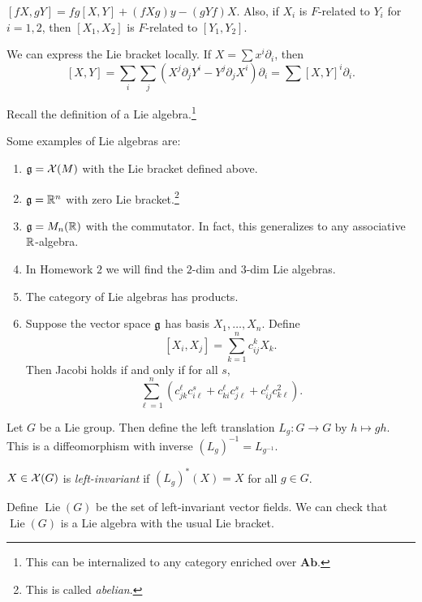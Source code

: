 \documentclass[twoside, 10pt]{article}
\begin{document}
    \begin{prop}
        $[fX,gY] = fg[X,Y] + (fXg)y - (gYf)X$. Also, if $X_i$ is $F$-related to $Y_i$ for $i = 1,2$, then $[X_1,X_2]$ is $F$-related to $[Y_1,Y_2]$.
    \end{prop}

    We can express the Lie bracket locally. If $X = \sum x^i \partial_i$, then 
    \[ [X,Y] = \sum_i \sum_j (X^j \partial_j Y^i - Y^j \partial_j X^i) \partial_i = \sum [X,Y]^i \partial_i.\]

    Recall the definition of a Lie algebra.\footnote{This can be internalized to any category enriched over $\mathbf{Ab}$.} 

    \begin{exm}
        Some examples of Lie algebras are:
        \begin{enumerate}
            \item $\mathfrak{g} = \mathcal{X}(M)$ with the Lie bracket defined above.
            \item $\mathfrak{g} = \mathbb{R}^n$ with zero Lie bracket.\footnote{This is called \textit{abelian}.}
            \item $\mathfrak{g} = M_n(\mathbb{R})$ with the commutator. In fact, this generalizes to any associative $\mathbb{R}$-algebra.
            \item In Homework $2$ we will find the $2$-dim and $3$-dim Lie algebras.
            \item The category of Lie algebras has products.
            \item Suppose the vector space $\mathfrak{g}$ has basis $X_1, \ldots, X_n$. Define 
                \[ [X_i,X_j] = \sum_{k=1}^n c_{ij}^k X_k.\] Then Jacobi holds if and only if for all $s$,
                \[ \sum_{\ell = 1}^{n} (c_{jk}^{\ell}c_{i\ell}^s + c_{ki}^{\ell}c_{j\ell}^s + c_{ij}^{\ell}c_{k\ell}^2).\]
        \end{enumerate}
    \end{exm}

    Let $G$ be a Lie group. Then define the left translation $L_g:G \to G$ by $h \mapsto gh$. This is a diffeomorphism with inverse $(L_g)^{-1} = L_{g^{-1}}$.

    \begin{defn}
        $X \in \mathcal{X}(G)$ is \textit{left-invariant} if $(L_g)^*(X) = X$ for all $g \in G$.
    \end{defn}

    Define $\operatorname{Lie}(G)$ be the set of left-invariant vector fields. We can check that $\operatorname{Lie}(G)$ is a Lie algebra with the usual Lie bracket.
\end{document}
